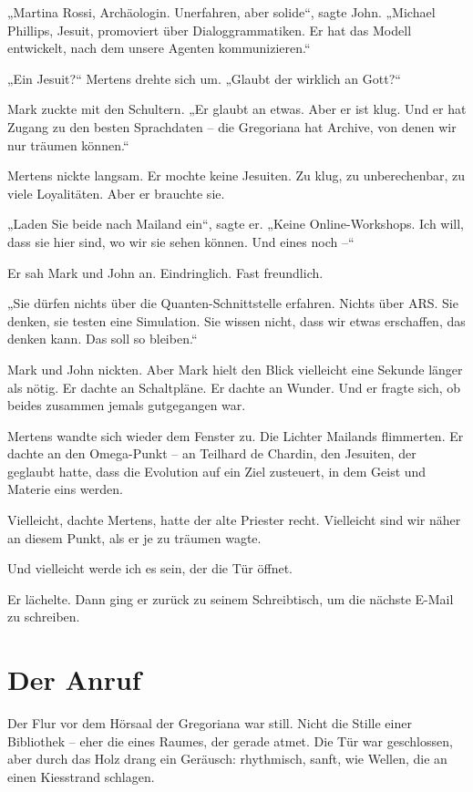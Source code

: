 \documentclass[
]{article}
\begin{document}
„Martina Rossi, Archäologin. Unerfahren, aber solide``, sagte John. „Michael Phillips, Jesuit, promoviert über Dialoggrammatiken. Er hat das Modell entwickelt, nach dem unsere Agenten kommunizieren.``

„Ein Jesuit?{\kern0pt}`` Mertens drehte sich um. „Glaubt der wirklich an Gott?{\kern0pt}``

Mark zuckte mit den Schultern. „Er glaubt an etwas. Aber er ist klug. Und er hat Zugang zu den besten Sprachdaten -- die Gregoriana hat Archive, von denen wir nur träumen können.``

Mertens nickte langsam. Er mochte keine Jesuiten. Zu klug, zu unberechenbar, zu viele Loyalitäten. Aber er brauchte sie.

„Laden Sie beide nach Mailand ein``, sagte er. „Keine Online-Workshops. Ich will, dass sie hier sind, wo wir sie sehen können. Und eines noch --``

Er sah Mark und John an. Eindringlich. Fast freundlich.

„Sie dürfen nichts über die Quanten-Schnittstelle erfahren. Nichts über ARS. Sie denken, sie testen eine Simulation. Sie wissen nicht, dass wir etwas erschaffen, das denken kann. Das soll so bleiben.``

Mark und John nickten. Aber Mark hielt den Blick vielleicht eine Sekunde länger als nötig. Er dachte an Schaltpläne. Er dachte an Wunder. Und er fragte sich, ob beides zusammen jemals gutgegangen war.

Mertens wandte sich wieder dem Fenster zu. Die Lichter Mailands flimmerten. Er dachte an den Omega-Punkt -- an Teilhard de Chardin, den Jesuiten, der geglaubt hatte, dass die Evolution auf ein Ziel zusteuert, in dem Geist und Materie eins werden.

Vielleicht, dachte Mertens, hatte der alte Priester recht. Vielleicht sind wir näher an diesem Punkt, als er je zu träumen wagte.

Und vielleicht werde ich es sein, der die Tür öffnet.

Er lächelte. Dann ging er zurück zu seinem Schreibtisch, um die nächste E-Mail zu schreiben.

\section{Der Anruf}\label{der-anruf}

Der Flur vor dem Hörsaal der Gregoriana war still. Nicht die Stille einer Bibliothek -- eher die eines Raumes, der gerade atmet. Die Tür war geschlossen, aber durch das Holz drang ein Geräusch: rhythmisch, sanft, wie Wellen, die an einen Kiesstrand schlagen.
\end{document}
